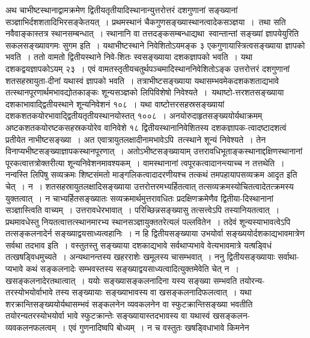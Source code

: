 \documentclass[11pt, openany]{book}
\begin{document}
\begin{sloppypar}
\noindent अथ चाभीष्टस्थानाद्वामक्रमेण द्वितीयतृतीयादिस्थानान्युत्तरोत्तरं दशगुणानां सङ्ख्यानां सञ्ज्ञाभिर्दशशतादिभिरसङ्केतयत्~। प्रथमस्थानं चैकगुणसङ्ख्यास्थानत्वादेकसञ्ज्ञया~।~तथा सति नवैवाङ्कास्तत्र स्थानसम्बन्धात्~। स्थानानि वा तत्तदङ्कसम्बन्धाद्यथा~स्वान्तान्तां सङ्ख्यां ज्ञापयेयुरिति सकलसङ्ख्यावगमः सुगम इति~। यथाभीष्टस्थाने निवेशितोऽयमङ्क ३ एकगुणायास्त्रित्वसङ्ख्याया ज्ञापको भवति~। ततो वामतो द्वितीयस्थाने निवे-शितः स्वसङ्ख्याया दशकज्ञापको भवति~। यथा दशकद्वयज्ञापकोऽयम् २३~। एवं वामतस्तृतीयचतुर्थपञ्चमादिस्थाननिवेशितोऽङ्क उत्तरोत्तरं दशगुणानां शतसहस्रायुता-दीनां यथास्वं ज्ञापको भवति~। तत्राभीष्टसङ्ख्याया यथासम्भवमेकदशकशताद्यभावे तत्स्थानपूरणार्थमभावद्योतकाङ्कः शून्यसञ्ज्ञको लिपिविशेषो निवेश्यते~।~यथाष्टो-त्तरशतसङ्ख्याया दशकाभावाद्द्वितीयस्थाने शून्यनिवेशनं १०८~। यथा वाष्टोत्तरसहस्रसङ्ख्यायां दशकशतकयोरभावाद्द्वितीयतृतीयस्थानयोस्तत् १००८~। अनयोरुदाहृतसङ्ख्ययोर्यथाक्रमम् अष्टकशतकयोरष्टकसहस्रकयोरेव वानिवेशे १८ द्वितीयस्थानानिवेशितस्य दशकज्ञापक-त्वादष्टादशत्वं प्रतीयेत नाभीष्टसङ्ख्या~। अत एवात्रायुतलक्षादीनामभावेऽपि~तत्स्थाने शून्यं निवेश्यते~। तेन विनाप्यभीष्टसङ्ख्याज्ञापकस्थानपूरणात्~। अतोऽभीष्टसङ्ख्यायाम् उत्तरावधिभूताङ्कस्थानाद्दक्षिणस्थानानां पूरकत्वात्तत्रोक्तरीत्या शून्यनिवेशनमावश्यकम्~। वामस्थानानां त्वपूरकत्वादानन्त्याच्च न तत्तथेति~। नन्वस्ति लिपिषु सव्यक्रमः शिष्टसंमतो माङ्गलिकत्वादादरणीयश्च तत्कथं तमपहायापसव्यक्रम आदृत इति चेत्~। न~। शतसहस्रायुतलक्षादिसङ्ख्याया उत्तरोत्तरमभ्यर्हितत्वात् तत्सव्यक्रमस्योचितत्वादेतत्क्रमस्य युक्तत्वात्~। न चाभ्यर्हितसङ्ख्यातः सव्यक्रमार्थमुत्तरावधितः प्रदक्षिणक्रमेणैव द्वितीया-दिस्थानानां सञ्ज्ञास्त्विति वाच्यम्~। उत्तरावधेरभावात्~। परिच्छिन्नसङ्ख्यासु तत्सत्त्वेऽपि तस्यानियतत्वात्~। प्रथमावधेस्तु नियतत्वात्तत्स्थानमारभ्य स्थानसञ्ज्ञायुक्ततरेत्यलं पल्लवितेन~। तदेवं शून्यस्याभावत्वेऽपि तत्सङ्कलनादेर्न सङ्ख्याद्वयसाध्यत्वहानिः~। न हि द्वितीयसङ्ख्याया उभयोर्वा सङ्ख्ययोर्दशकाद्यभावमात्रेण सर्वथा तदभाव इति~। वस्तुतस्तु सङ्ख्याया दशकाद्यभावे सर्वथाप्यभावे वेत्यभावमात्रे यत्षड्विधं तत्खषड्विधमुच्यते~। अन्यथानन्तस्य खहरराशेः खमूलस्य चासम्भवात्~। ननु द्वितीयसङ्ख्यायाः सर्वाथा-प्यभावे कथं सङ्कलनादेः सम्भवस्तस्य सङ्ख्याद्वयसाध्यत्वादित्युक्तमेवेति चेत् न~। खसङ्कलनादेरतथात्वात्~। ययोः सङ्ख्यासङ्कलनादिना यस्य सङ्ख्या सम्भवति तयोरन्य-तरस्योभयोर्वाभावे तस्य सङ्ख्यायाः सङ्ख्याभावस्य वा खसङ्कलनादिफलत्वात्~। यथा शरक्रान्तिसङ्ख्ययोर्यथासम्भवं सङ्कलनेन व्यवकलनेन वा स्फुटक्रान्तिसङ्ख्या भवतीति तयोरन्यतरस्योभयोर्वा भावे स्फुटक्रान्तेः सङ्ख्यायास्तदभावस्य वा यथास्वं खसङ्कलन-व्यवकलनफलत्वम्~। एवं गुणनादिष्वपि बोध्यम्~। न च वस्तुतः खषड्विधाभावे किमनेन 
\end{sloppypar}
\end{document}
